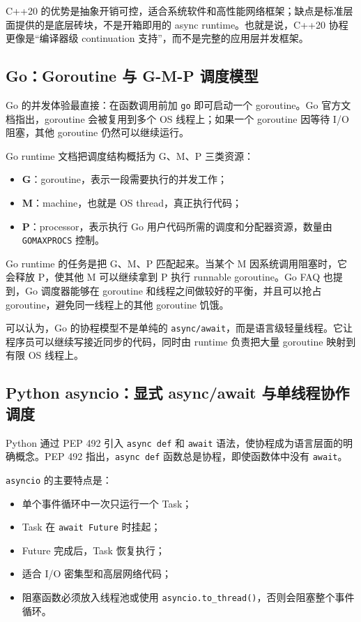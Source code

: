\documentclass[UTF8,zihao=-4]{ctexart}
\begin{document}
C++20 的优势是抽象开销可控，适合系统软件和高性能网络框架；缺点是标准层面提供的是底层砖块，不是开箱即用的 async runtime。也就是说，C++20 协程更像是“编译器级 continuation 支持”，而不是完整的应用层并发框架。

\subsection{Go：Goroutine 与 G-M-P 调度模型}

Go 的并发体验最直接：在函数调用前加 \texttt{go} 即可启动一个 goroutine。Go 官方文档指出，goroutine 会被复用到多个 OS 线程上；如果一个 goroutine 因等待 I/O 阻塞，其他 goroutine 仍然可以继续运行\cite{go-effective}。

Go runtime 文档把调度结构概括为 G、M、P 三类资源\cite{go-runtime}：

\begin{itemize}
  \item \textbf{G}：goroutine，表示一段需要执行的并发工作；
  \item \textbf{M}：machine，也就是 OS thread，真正执行代码；
  \item \textbf{P}：processor，表示执行 Go 用户代码所需的调度和分配器资源，数量由 \texttt{GOMAXPROCS} 控制。
\end{itemize}

Go runtime 的任务是把 G、M、P 匹配起来。当某个 M 因系统调用阻塞时，它会释放 P，使其他 M 可以继续拿到 P 执行 runnable goroutine。Go FAQ 也提到，Go 调度器能够在 goroutine 和线程之间做较好的平衡，并且可以抢占 goroutine，避免同一线程上的其他 goroutine 饥饿\cite{go-faq}。

可以认为，Go 的协程模型不是单纯的 \texttt{async/await}，而是语言级轻量线程。它让程序员可以继续写接近同步的代码，同时由 runtime 负责把大量 goroutine 映射到有限 OS 线程上。

\subsection{Python asyncio：显式 async/await 与单线程协作调度}

Python 通过 PEP 492 引入 \texttt{async def} 和 \texttt{await} 语法，使协程成为语言层面的明确概念。PEP 492 指出，\texttt{async def} 函数总是协程，即使函数体中没有 \texttt{await}\cite{pep492}。

\texttt{asyncio} 的主要特点是：
\begin{itemize}
  \item 单个事件循环中一次只运行一个 Task；
  \item Task 在 \texttt{await Future} 时挂起；
  \item Future 完成后，Task 恢复执行；
  \item 适合 I/O 密集型和高层网络代码；
  \item 阻塞函数必须放入线程池或使用 \texttt{asyncio.to\_thread()}，否则会阻塞整个事件循环。
\end{itemize}
\end{document}
